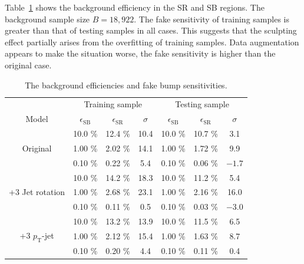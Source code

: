 \documentclass[12pt]{article}
\begin{document}
        Table~\ref{tab:background_efficiency_in_SR_SB_and_fake_sensitivity} shows the background efficiency in the SR and SB regions. The background sample size $B = 18,922$. The fake sensitivity of training samples is greater than that of testing samples in all cases. This suggests that the sculpting effect partially arises from the overfitting of training samples. Data augmentation appears to make the situation worse, the fake sensitivity is higher than the original case.
        \begin{table}[htpb]
            \centering
            \caption{The background efficiencies and fake bump sensitivities.}
            \label{tab:background_efficiency_in_SR_SB_and_fake_sensitivity}
            \begin{tabular}{c|ccc|ccc}
                                                   & \multicolumn{3}{c|}{Training sample}                       & \multicolumn{3}{c}{Testing sample}                         \\
            Model                                  & $\epsilon_{\text{SB}}$ & $\epsilon_{\text{SR}}$ & $\sigma$ & $\epsilon_{\text{SB}}$ & $\epsilon_{\text{SR}}$ & $\sigma$ \\ \hline
            \multirow{3}{*}{Original}              & 10.0 \%                & 12.4 \%                & 10.4     & 10.0 \%                & 10.7 \%                & 3.1      \\
                                                   & 1.00 \%                & 2.02 \%                & 14.1     & 1.00 \%                & 1.72 \%                & 9.9      \\
                                                   & 0.10 \%                & 0.22 \%                & 5.4      & 0.10 \%                & 0.06 \%                & $-1.7$   \\ \hline
            \multirow{3}{*}{+3 Jet rotation}       & 10.0 \%                & 14.2 \%                & 18.3     & 10.0 \%                & 11.2 \%                & 5.4      \\
                                                   & 1.00 \%                & 2.68 \%                & 23.1     & 1.00 \%                & 2.16 \%                & 16.0     \\
                                                   & 0.10 \%                & 0.11 \%                & 0.5      & 0.10 \%                & 0.03 \%                & $-3.0$   \\ \hline
            \multirow{3}{*}{+3 $p_{\text{T}}$-jet} & 10.0 \%                & 13.2 \%                & 13.9     & 10.0 \%                & 11.5 \%                & 6.5      \\
                                                   & 1.00 \%                & 2.12 \%                & 15.4     & 1.00 \%                & 1.63 \%                & 8.7      \\
                                                   & 0.10 \%                & 0.20 \%                & 4.4      & 0.10 \%                & 0.11 \%                & 0.4     
            \end{tabular}
        \end{table}
\end{document}

